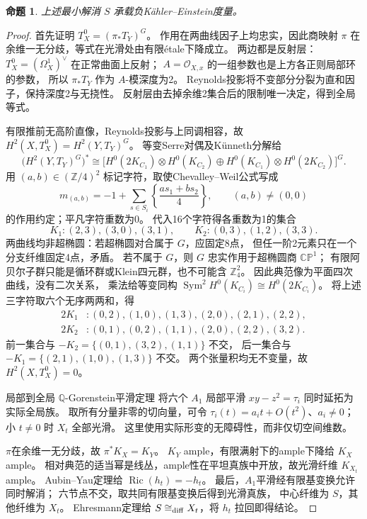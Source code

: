 \documentclass[UTF8,a4paper,11pt,fontset=fandol]{ctexart}
\numberwithin{equation}{section}
\newtheorem{proposition}[theorem]{命题}
\theoremstyle{definition}
\newcommand{\Ric}{\operatorname{Ric}}
\newcommand{\CP}{\mathbb{CP}}
\newcommand{\Z}{\mathbb Z}
\begin{document}
\begin{proposition}
上述最小解消 $S$ 承载负K\"ahler--Einstein度量。
\end{proposition}
\begin{proof}
首先证明 $T_X^0=(\pi_*T_Y)^G$。
作用在两曲线因子上均忠实，因此商映射 $\pi$ 在余维一无分歧，等式在光滑处由有限\'etale下降成立。
两边都是反射层：$T_X^0=(\Omega_X^1)^\vee$ 在正常曲面上反射；
$A=\mathcal O_{X,x}$ 的一组参数也是上方各正则局部环的参数，
所以 $\pi_*T_Y$ 作为 $A$-模深度为2。
Reynolds投影将不变部分分裂为直和因子，保持深度2与无挠性。
反射层由去掉余维2集合后的限制唯一决定，得到全局等式。

有限推前无高阶直像，Reynolds投影与上同调相容，故
$H^2(X,T_X^0)=H^2(Y,T_Y)^G$。
等变Serre对偶及K\"unneth分解给
\[
\bigl(H^2(Y,T_Y)^G\bigr)^*\cong
\bigl[H^0(2K_{C_1})\otimes H^0(K_{C_2})
\oplus H^0(K_{C_1})\otimes H^0(2K_{C_2})\bigr]^G.
\]
用 $(a,b)\in(\Z/4)^2$ 标记字符，取使Chevalley--Weil公式写成
\[
m_{(a,b)}=-1+\sum_{s\in S_i}
\left\{\frac{a s_1+b s_2}{4}\right\},\qquad (a,b)\ne(0,0)
\]
的作用约定；平凡字符重数为0。
代入16个字符得各重数为1的集合
\[
K_1:(2,3),(3,0),(3,1),\qquad
K_2:(0,3),(1,2),(3,3).
\]
两曲线均非超椭圆：若超椭圆对合属于 $G$，应固定8点，
但任一阶2元素只在一个分支纤维固定4点，矛盾。
若不属于 $G$，则 $G$ 忠实作用于超椭圆商 $\CP^1$；
有限阿贝尔子群只能是循环群或Klein四元群，也不可能含 $\Z_4^2$。
因此典范像为平面四次曲线，没有二次关系，
乘法给等变同构 $\operatorname{Sym}^2H^0(K_{C_i})\cong H^0(2K_{C_i})$。
将上述三字符取六个无序两两和，得
\begin{align*}
2K_1&:(0,2),(1,0),(1,3),(2,0),(2,1),(2,2),\\
2K_2&:(0,1),(0,2),(1,1),(2,0),(2,2),(3,2).
\end{align*}
前一集合与 $-K_2=\{(0,1),(3,2),(1,1)\}$ 不交，
后一集合与 $-K_1=\{(2,1),(1,0),(1,3)\}$ 不交。
两个张量积均无不变量，故 $H^2(X,T_X^0)=0$。

局部到全局 $\mathbb Q$-Gorenstein平滑定理
\cite[Proposition 2.4(2)]{LeePark}
将六个 $A_1$ 局部平滑 $xy-z^2=\tau_i$ 同时延拓为实际全局族。
取所有分量非零的切向量，可令
$\tau_i(t)=a_it+O(t^2)$、$a_i\ne0$；小 $t\ne0$ 时 $X_t$ 全部光滑。
这里使用实际形变的无障碍性，而非仅切空间维数。

$\pi$在余维一无分歧，故 $\pi^*K_X=K_Y$。
$K_Y$ ample，有限满射下的ample下降给 $K_X$ ample。
相对典范的适当幂是线丛，ample性在平坦真族中开放，故光滑纤维 $K_{X_t}$ ample。
Aubin--Yau定理给 $\Ric(h_t)=-h_t$。
最后，$A_1$平滑经有限基变换允许同时解消；
六节点不交，取共同有限基变换后得到光滑真族，
中心纤维为 $S$，其他纤维为 $X_t$。
Ehresmann定理给 $S\cong_{\rm diff}X_t$，将 $h_t$ 拉回即得结论。
\end{proof}
\end{document}
